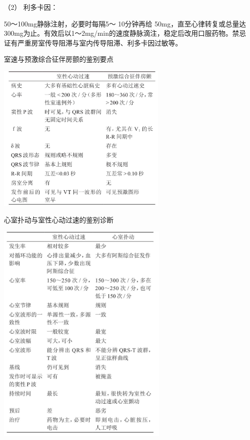 \hypertarget{text00292.htmlux5cux23CHP10-2-5-3-1-1-2}{}
（2） 利多卡因：

50～100mg静脉注射，必要时每隔5～ 10分钟再给
50mg，直至心律转复或总量达300mg为止。有效后以1～2mg/min的速度静脉滴注，稳定后改用口服药物。禁忌证有严重房室传导阻滞与室内传导阻滞、利多卡因过敏等。

\begin{table}[htbp]
\centering
\caption{室速与预激综合征伴房颤的鉴别要点}
\label{tab102-10}
\includegraphics[width=3.28125in,height=2.86458in]{./images/Image00442.jpg}
\end{table}

\begin{table}[htbp]
\centering
\caption{心室扑动与室性心动过速的鉴别诊断}
\label{tab102-11}
\includegraphics[width=3.30208in,height=4.35417in]{./images/Image00443.jpg}
\end{table}


